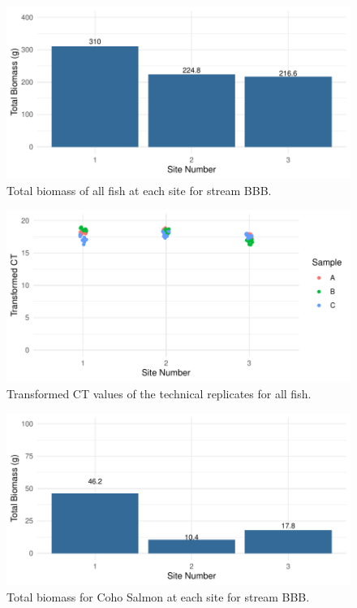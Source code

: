 \begin{figure}[H]
\centering
\includegraphics{Chapter5Images/BBB_Ef_new.pdf}
\caption{ Total biomass of all fish at each site for stream BBB.}
\label{fig:testBBBbiom}
\end{figure}



\begin{figure}[H]
\centering
\includegraphics{Chapter5Images/BBB_ef_tct.pdf}
\caption{ Transformed CT values of the technical replicates for all fish.}
\label{fig:BBB_ef}
\end{figure}




\begin{figure}[H]
\centering
\includegraphics{Chapter5Images/BBB_Co_new.pdf}
\caption{ Total biomass for Coho Salmon at each site for stream BBB.}
\label{fig:testBBBbiomCo}
\end{figure}




